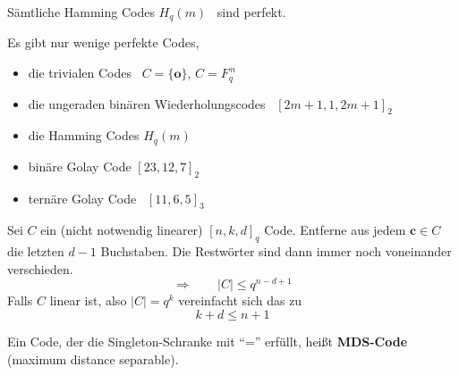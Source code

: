 \begin{satz}
Sämtliche Hamming Codes $H_q(m)$ \ sind perfekt.
\end{satz}

\begin{bemerkung}
Es gibt nur wenige perfekte Codes,
\begin{itemize}
\item[-] die trivialen Codes \ $C = \{\mathbf{o}\}$, $C = F_q^{\,n}$
\item[-] die ungeraden binären Wiederholungscodes \ $[2m+1, 1, 2m+1]_2$
\item[-] die Hamming Codes $H_q(m)$
\item[-] binäre Golay Code \quad $[23, 12, 7]_2$
\item[-] ternäre Golay Code \ $[11, 6, 5]_3$
\end{itemize}
\end{bemerkung}

\begin{satz}
Sei $C$ ein (nicht notwendig linearer) $[n, k, d]_q$ Code. Entferne aus jedem $\mathbf{c} \in C$ die letzten $d-1$ Buchstaben. Die Restwörter sind dann immer noch voneinander verschieden.
\[ \Rightarrow \qquad |C| \leq q^{n-d+1} \]
Falls $C$ linear ist, also $|C| = q^k$ vereinfacht sich das zu
\[ k + d \leq n + 1 \]
\end{satz}

\begin{definition}
Ein Code, der die Singleton-Schranke mit "`="' erfüllt, heißt \textbf{MDS-Code} (maximum distance separable).
\end{definition}

